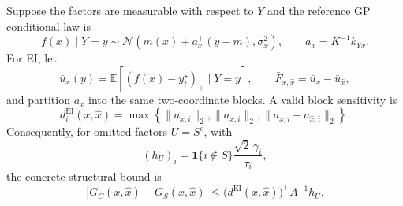 Suppose the factors are measurable with respect to $Y$ and the reference GP
conditional law is
\[
 f(x)\mid Y=y
 \sim
 \mathcal N\!\left(m(x)+a_x^\top(y-m),\sigma_x^2\right),
 \qquad
 a_x=K^{-1}k_{Yx}.
\]
For EI, let
\[
 \bar u_x(y)=\mathbb E[(f(x)-y_t^\star)_+\mid Y=y],
 \qquad
 \bar F_{x,\widehat x}=\bar u_x-\bar u_{\widehat x},
\]
and partition $a_x$ into the same two-coordinate blocks.  A valid block
sensitivity is
\begin{equation}
 d_i^{\mathrm{EI}}(x,\widehat x)
 =\max\!\left\{
 \|a_{x,i}\|_2,
 \|a_{\widehat x,i}\|_2,
 \|a_{x,i}-a_{\widehat x,i}\|_2
 \right\}.
 \label{eq:ei-block-footprint}
\end{equation}
Consequently, for omitted factors $U=S^c$, with
\[
 (h_U)_i
 =\mathbf 1\{i\notin S\}\frac{\sqrt2\,\gamma_i}{\tau_i},
\]
the concrete structural bound is
\begin{equation}
 |G_C(x,\widehat x)-G_S(x,\widehat x)|
 \le
 \bigl(d^{\mathrm{EI}}(x,\widehat x)\bigr)^\top A^{-1}h_U.
 \label{eq:symmetry-ei-bound}
\end{equation}

